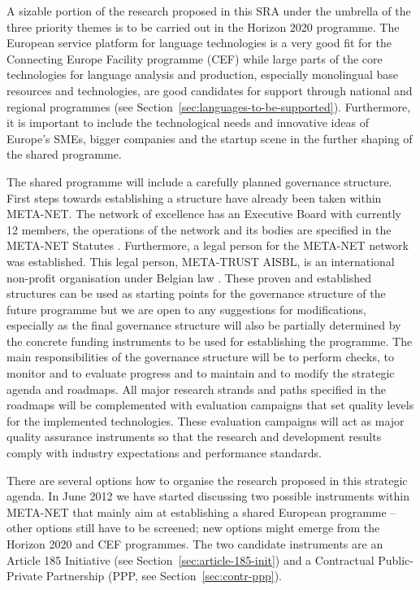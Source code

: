 \documentclass[10pt, plain]{../../metanetpaper}
\begin{document}
\begin{multicols}{2}
A sizable portion of the research proposed in this SRA under the umbrella of the three priority themes is to be carried out in the Horizon 2020 programme. The European service platform for language technologies is a very good fit for the Connecting Europe Facility programme (CEF) while large parts of the core technologies for language analysis and production, especially monolingual base resources and technologies, are good candidates for support through national and regional programmes (see Section~\ref{sec:languages-to-be-supported}). Furthermore, it is important to include the technological needs and innovative ideas of Europe's SMEs, bigger companies and the startup scene in the further shaping of the shared programme. 

The shared programme will include a carefully planned governance structure. First steps towards establishing a structure have already been taken within META-NET. The network of excellence has an Executive Board with currently 12 members, the operations of the network and its bodies are specified in the META-NET Statutes \cite{statutes2012}. Furthermore, a legal person for the META-NET network was established. This legal person, META-TRUST AISBL, is an international non-profit organisation under Belgian law \cite{metatrust2012}. These proven and established structures can be used as starting points for the governance structure of the future programme but we are open to any suggestions for modifications, especially as the final governance structure will also be partially determined by the concrete funding instruments to be used for establishing the programme. The main responsibilities of the governance structure will be to perform checks, to monitor and to evaluate progress and to maintain and to modify the strategic agenda and roadmaps. All major research strands and paths specified in the roadmaps will be complemented with evaluation campaigns that set quality levels for the implemented technologies. These evaluation campaigns will act as major quality assurance instruments so that the research and development results comply with industry expectations and performance standards.

There are several options how to organise the research proposed in this strategic agenda. In June 2012 we have started discussing two possible instruments within META-NET that mainly aim at establishing a shared European programme -- other options still have to be screened; new options might emerge from the Horizon 2020 and CEF programmes. The two candidate instruments are an Article 185 Initiative (see Section~\ref{sec:article-185-init}) and a Contractual Public-Private Partnership (PPP, see Section~\ref{sec:contr-ppp}).


\end{multicols}
\end{document}
